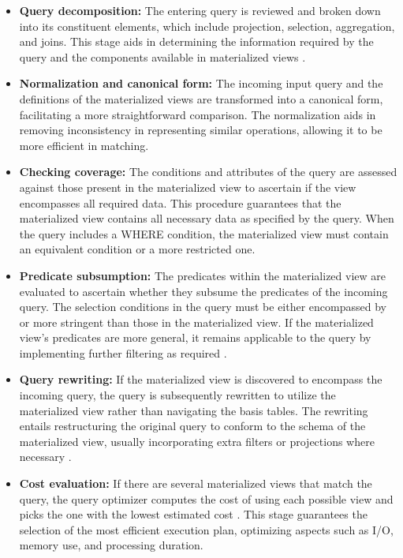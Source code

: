   \begin{itemize}
      \item \textbf{Query decomposition:} The entering query is reviewed and broken down into its constituent elements, which include projection, selection, aggregation, and joins. This stage aids in determining the information required by the query and the components available in materialized views \cite{theodoratos2000decomposition}.

      \item \textbf{Normalization and canonical form:} The incoming input query and the definitions of the materialized views are transformed into a canonical form, facilitating a more straightforward comparison. The normalization aids in removing inconsistency in representing similar operations, allowing it to be more efficient in matching.

     \item \textbf{Checking coverage:} The conditions and attributes of the query are assessed against those present in the materialized view to ascertain if the view encompasses all required data. This procedure guarantees that the materialized view contains all necessary data as specified by the query. When the query includes a WHERE condition, the materialized view must contain an equivalent condition or a more restricted one.
     
      \item \textbf{Predicate subsumption:} The predicates within the materialized view are evaluated to ascertain whether they subsume the predicates of the incoming query. The selection conditions in the query must be either encompassed by or more stringent than those in the materialized view. If the materialized view's predicates are more general, it remains applicable to the query by implementing further filtering as required \cite{adali1996query}.

      \item \textbf{Query rewriting:} If the materialized view is discovered to encompass the incoming query, the query is subsequently rewritten to utilize the materialized view rather than navigating the basis tables. The rewriting entails restructuring the original query to conform to the schema of the materialized view, usually incorporating extra filters or projections where necessary \cite{haldar2001query}.

         \item \textbf{Cost evaluation:} If there are several materialized views that match the query, the query optimizer computes the cost of using each possible view and picks the one with the lowest estimated cost \cite{hulgeri2001cost}.
This stage guarantees the selection of the most efficient execution plan, optimizing aspects such as I/O, memory use, and processing duration.

  \end{itemize}
  

